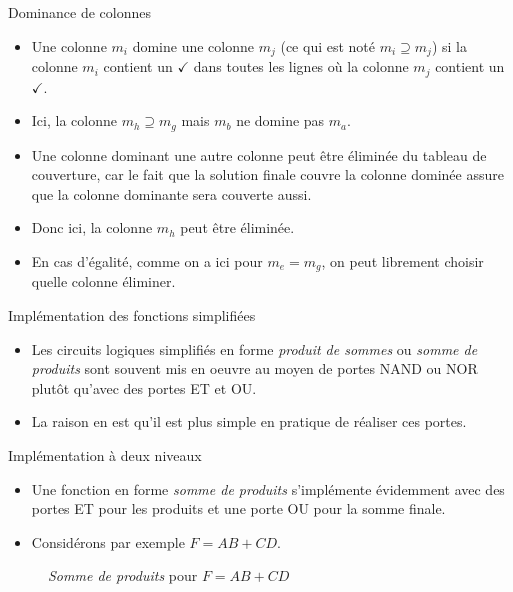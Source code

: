 \documentclass[presentation]{beamer}
\begin{document}
\begin{frame}[label={sec:orgedb466e}]{Dominance de colonnes}
\begin{itemize}
\item Une colonne \(m_i\) domine une colonne \(m_j\) (ce qui est noté \(m_i \supseteq m_j\)) si la colonne \(m_i\) contient un \(\checkmark\) dans toutes les lignes où la colonne \(m_j\) contient un \(\checkmark\).

\item Ici, la colonne \(m_h \supseteq m_g\) mais \(m_b\) ne domine pas \(m_a\).

\item Une colonne \alert{dominant} une autre colonne peut être éliminée du tableau de couverture, car le fait que la solution finale couvre la colonne dominée assure que la colonne dominante sera couverte aussi.

\item Donc ici, la colonne \(m_h\) peut être éliminée.

\item En cas d'égalité, comme on a ici pour \(m_e = m_g\), on peut librement choisir quelle colonne éliminer.
\end{itemize}
\end{frame}

\begin{frame}[label={sec:org7a958e9}]{Implémentation des fonctions simplifiées}
\begin{itemize}
\item Les circuits logiques simplifiés en forme \emph{produit de sommes} ou \emph{somme de produits} sont souvent mis en oeuvre au moyen de portes NAND ou NOR plutôt qu'avec des portes ET et OU.

\item La raison en est qu'il est plus simple en pratique de réaliser ces portes.
\end{itemize}
\end{frame}

\begin{frame}[label={sec:org78e4c2a}]{Implémentation à deux niveaux}
\begin{itemize}
\item Une fonction en forme \emph{somme de produits} s'implémente évidemment avec des portes ET pour les produits et une porte OU pour la somme finale.

\item Considérons par exemple \(F = AB + CD\).
\end{itemize}

\begin{figure}[htbp]
\centering

\caption{\label{fig:orgd50277c}\emph{Somme de produits} pour \(F = AB + CD\)}
\end{figure} 
\end{frame}
\end{document}
